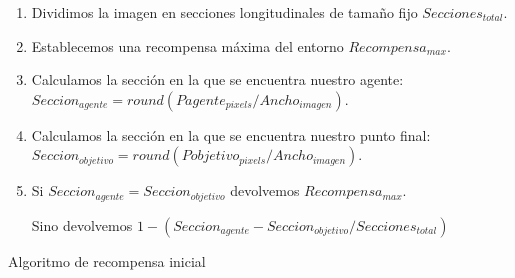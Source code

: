 \begin{algorithm}[H]
\label{algrecompensainicial}
\SetAlgoLined
\medskip
\begin{enumerate}
	\item Dividimos la imagen en secciones longitudinales de tamaño fijo $Secciones_{total}$.
	\item Establecemos una recompensa máxima del entorno $Recompensa_{max}$.
	\item Calculamos la sección en la que se encuentra nuestro agente:
	$Seccion_{agente} = round(Pagente_{pixels} / Ancho_{imagen})$.
	\item Calculamos la sección en la que se encuentra nuestro punto final:
	$Seccion_{objetivo} = round(Pobjetivo_{pixels} / Ancho_{imagen})$.
	\item Si $Seccion_{agente} = Seccion_{objetivo}$ devolvemos $Recompensa_{max}$.
	
	Sino devolvemos $1 - (Seccion_{agente}-Seccion_{objetivo}/Secciones_{total}) $
\end{enumerate}
	\caption{Algoritmo de recompensa inicial}
\end{algorithm}
	